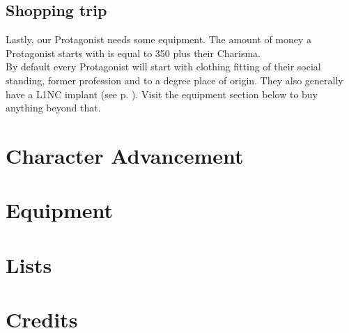 \documentclass[11pt,a4paper,openany,dvipsnames]{book}
\begin{document}
	\section{Shopping trip}
	Lastly, our Protagonist needs some equipment.
	The amount of money a Protagonist starts with is equal to 350 plus their Charisma.
	\\%
	By default every Protagonist will start with clothing
		fitting of their social standing, former profession and to a degree place of origin.
	They also generally have a L1NC implant (see p. \pageref{implant:l1nc}).
	Visit the equipment section below to buy anything beyond that.
	
	\chapter{Character Advancement}
	

	\chapter{Equipment}
	\label{ch:equipment}
	
	
	
	
	
	
	

	
	

	\chapter{Lists}
	
	
	
	
	
	
	
	
	
	
	

	
	
	
	

	\printindex

	\chapter{Credits}
	

\end{document}
